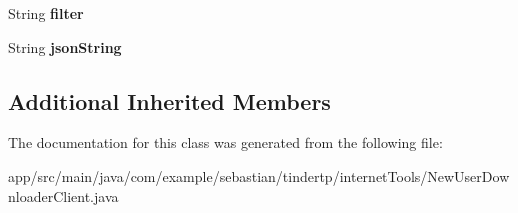 \begin{DoxyCompactItemize}
\item 
String {\bfseries filter}\hypertarget{classcom_1_1example_1_1sebastian_1_1tindertp_1_1internetTools_1_1NewUserDownloaderClient_ab014634c05de689e9b566d3aed89a265}{}\label{classcom_1_1example_1_1sebastian_1_1tindertp_1_1internetTools_1_1NewUserDownloaderClient_ab014634c05de689e9b566d3aed89a265}

\item 
String {\bfseries json\+String}\hypertarget{classcom_1_1example_1_1sebastian_1_1tindertp_1_1internetTools_1_1NewUserDownloaderClient_a0e7fa342f6feb97975ea364ba2de1ddc}{}\label{classcom_1_1example_1_1sebastian_1_1tindertp_1_1internetTools_1_1NewUserDownloaderClient_a0e7fa342f6feb97975ea364ba2de1ddc}

\end{DoxyCompactItemize}
\subsection*{Additional Inherited Members}


The documentation for this class was generated from the following file\+:\begin{DoxyCompactItemize}
\item 
app/src/main/java/com/example/sebastian/tindertp/internet\+Tools/New\+User\+Downloader\+Client.\+java\end{DoxyCompactItemize}
